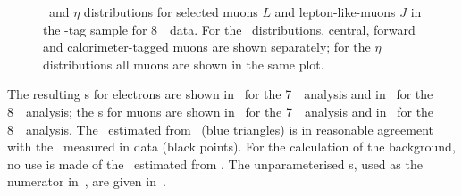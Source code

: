\begin{figure}[h!]
{        }
    \caption[\pt\ and $\eta$ distributions for selected muons $L$ and
    muon-like-jets $J$ in the \Z-tag sample for 8~\tev\ data.]
    {\small \pt\ and $\eta$ distributions for selected muons $L$ and
    lepton-like-muons $J$ in the \Z-tag sample for 8~\tev\ data. 
    For the \pt\ distributions, central, forward and calorimeter-tagged muons are shown
    separately; for the $\eta$ distributions all muons are
    shown in the same plot.}
\label{fig:ljdist-mu-eight} 
\end{figure}


The resulting \fakefactor s for electrons are shown in~ for the
7~\tev\ analysis and in~ for the 8~\tev\ analysis; the \fakefactor s
for muons are shown in~ for the
7~\tev\ analysis and in~ for the 8~\tev\ analysis. The
\ffactor\ estimated from \mc\ (blue triangles) is in reasonable agreement with
the \ffactor\ measured in data (black points). For the calculation of the
background, no use is made of the \ffactor\ estimated from \mc. The unparameterised \FF
s, used as the numerator in~, are given in~.

